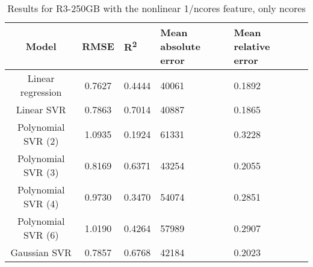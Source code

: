 \begin{table}[H]
\centering
\begin{adjustbox}{center}
\begin{tabular}{c | c M{1.2cm} M{2.5cm} M{2.5cm} M{1.8cm}}
Model & RMSE & R\textsuperscript{2} & Mean absolute error & Mean relative error \tabularnewline
\hline
Linear regression & 0.7627 & 0.4444 &  40061 & 0.1892 \\
Linear SVR & 0.7863 & 0.7014 &  40887 & 0.1865 \\
Polynomial SVR (2) & 1.0935 & 0.1924 &  61331 & 0.3228 \\
Polynomial SVR (3) & 0.8169 & 0.6371 &  43254 & 0.2055 \\
Polynomial SVR (4) & 0.9730 & 0.3470 &  54074 & 0.2851 \\
Polynomial SVR (6) & 1.0190 & 0.4264 &  57989 & 0.2907 \\
Gaussian SVR & 0.7857 & 0.6768 &  42184 & 0.2023 \\
\end{tabular}
\end{adjustbox}
\\
\caption{Results for R3-250GB with the nonlinear 1/ncores feature, only ncores}
\label{tab:all_nonlinear_R3_250}
\end{table}
